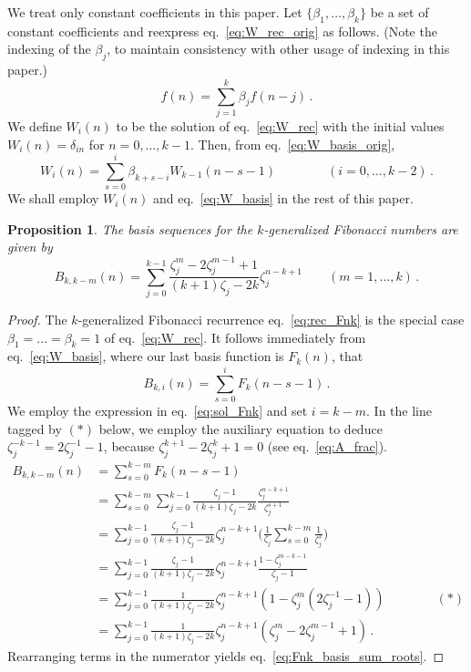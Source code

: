 \documentclass[review]{elsarticle}
\theoremstyle{plain}
\newtheorem{proposition}[theorem]{Proposition}
\begin{document}
We treat only constant coefficients in this paper.
Let $\{\beta_1,\dots,\beta_k\}$ be a set of constant coefficients and reexpress eq.~\eqref{eq:W_rec_orig} as follows.
(Note the indexing of the $\beta_j$, to maintain consistency with other usage of indexing in this paper.)
\begin{equation}
\label{eq:W_rec}
f(n) = \sum_{j=1}^k \beta_j f(n-j) \,.
\end{equation}
We define $W_i(n)$ to be the solution of
eq.~\eqref{eq:W_rec} with the initial values
$W_i(n) = \delta_{in}$ for $n=0,\dots,k-1$.
Then, from eq.~\eqref{eq:W_basis_orig},
\begin{equation}
\label{eq:W_basis}
W_i(n) = \sum_{s=0}^i \beta_{k+s-i} W_{k-1}(n-s-1) \qquad\qquad (i=0,\dots,k-2) \,.
\end{equation}
We shall employ $W_i(n)$ and eq.~\eqref{eq:W_basis} in the rest of this paper.
\begin{proposition}
The basis sequences for the $k$-generalized Fibonacci numbers are given by
\begin{equation}
\label{eq:Fnk_basis_sum_roots}
B_{k,k-m}(n)
= \sum_{j=0}^{k-1} \frac{\zeta_j^m-2\zeta_j^{m-1}+1}{(k+1)\zeta_j-2k} \zeta_j^{n-k+1} \qquad (m=1,\dots,k) \,.
\end{equation}
\end{proposition}
\begin{proof}
The $k$-generalized Fibonacci recurrence eq.~\eqref{eq:rec_Fnk} is the special case $\beta_1=\dots=\beta_k=1$ of eq.~\eqref{eq:W_rec}.
It follows immediately from eq.~\eqref{eq:W_basis}, where our last basis function is $F_k(n)$, that
\begin{equation}
\label{eq:Fnk_basis}
B_{k,i}(n) = \sum_{s=0}^i F_k(n-s-1) \,.
\end{equation}
We employ the expression in eq.~\eqref{eq:sol_Fnk} and set $i=k-m$.
In the line tagged by $(*)$ below,
we employ the auxiliary equation to deduce $\zeta_j^{-k-1} = 2\zeta_j^{-1}-1$, because $\zeta_j^{k+1}-2\zeta_j^k+1=0$ (see eq.~\eqref{eq:A_frac}).
\begin{equation}
\begin{split}
  B_{k,k-m}(n) &= \sum_{s=0}^{k-m} F_k(n-s-1)
  \\
  &= \sum_{s=0}^{k-m} \sum_{j=0}^{k-1} \frac{\zeta_j-1}{(k+1)\zeta_j-2k} \frac{\zeta_j^{n-k+1}}{\zeta_j^{s+1}}
  \\
  &= \sum_{j=0}^{k-1} \frac{\zeta_j-1}{(k+1)\zeta_j-2k} \zeta_j^{n-k+1} \biggl(\frac{1}{\zeta_j}\sum_{s=0}^{k-m} \frac{1}{\zeta_j^s}\biggr)
  \\
  &= \sum_{j=0}^{k-1} \frac{\zeta_j-1}{(k+1)\zeta_j-2k} \zeta_j^{n-k+1} \frac{1-\zeta_j^{m-k-1}}{\zeta_j-1}
  \\
  &= \sum_{j=0}^{k-1} \frac{1}{(k+1)\zeta_j-2k} \zeta_j^{n-k+1} (1 -\zeta_j^m(2\zeta_j^{-1}-1)) \qquad\qquad (*)
  \\
  &= \sum_{j=0}^{k-1} \frac{1}{(k+1)\zeta_j-2k} \zeta_j^{n-k+1} (\zeta_j^m -2\zeta_j^{m-1} +1) \,.
\end{split}
\end{equation}
Rearranging terms in the numerator yields eq.~\eqref{eq:Fnk_basis_sum_roots}.
\end{proof}
\end{document}
